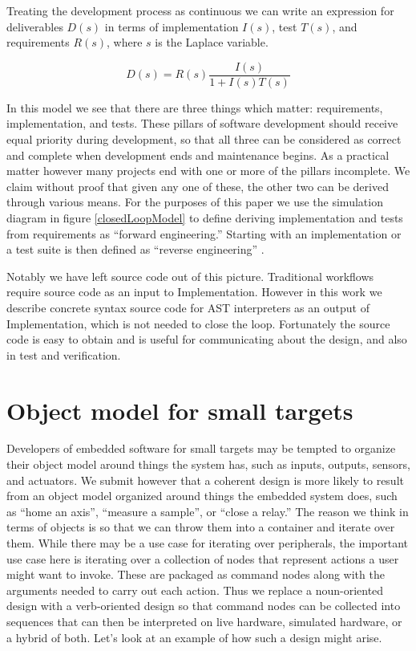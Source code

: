 \documentclass[a4paper,10pt]{article}
\begin{document}
Treating the development process as continuous we can write an expression for deliverables $D(s)$ in terms of implementation $I(s)$, test $T(s)$, and requirements $R(s)$, where $s$ is the Laplace variable.

\begin{equation}
D(s) = R(s)\frac{I(s)}{1+I(s)T(s)}
\label{transferFunction}
\end{equation}


In this model we see that there are three things which matter: requirements, implementation, and tests. These pillars of software development should receive equal priority during development, so that all three can be considered as correct and complete when development ends and maintenance begins. As a practical matter however many projects end with one or more of the pillars incomplete. We claim without proof that given any one of these, the other two can be derived through various means. For the purposes of this paper we use the simulation diagram in figure \ref{closedLoopModel} to define deriving implementation and tests from requirements as ``forward engineering.'' Starting with an implementation or a test suite is then defined as ``reverse engineering'' \cite{IraBaxter}.

Notably we have left source code out of this picture. Traditional workflows require source code as an input to Implementation. However in this work we describe concrete syntax source code for AST interpreters as an output of Implementation, which is not needed to close the loop. Fortunately the source code is easy to obtain and is useful for communicating about the design, and also in test and verification.

\section{Object model for small targets}

Developers of embedded software for small targets may be tempted to organize their object model around things the system has, such as inputs, outputs, sensors, and actuators. We submit however that a coherent design is more likely to result from an object model organized around things the embedded system does, such as ``home an axis'', ``measure a sample'', or ``close a relay.'' The reason we think in terms of objects is so that we can throw them into a container and iterate over them. While there may be a use case for iterating over peripherals, the important use case here is iterating over a collection of nodes that represent actions a user might want to invoke. These are packaged as command nodes along with the arguments needed to carry out each action. Thus we replace a noun-oriented design with a verb-oriented design so that command nodes can be collected into sequences that can then be interpreted on live hardware, simulated hardware, or a hybrid of both. Let's look at an example of how such a design might arise.
\end{document}
